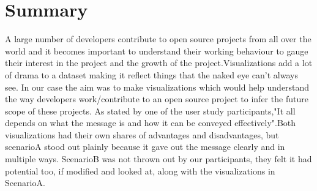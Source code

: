 \documentclass[seploa]{beavtex}
\begin{document}
\chapter{Summary}
A large number of developers contribute to open source projects from all over the world and it becomes important to understand their working behaviour to gauge their interest in the project and the growth of the project.Visualizations add a lot of drama to a dataset making it reflect things that the naked eye can't always see. In our case the aim was to make visualizations which would help understand the way developers work/contribute to an open source project to infer the future scope of these projects. As stated by one of the user study participants,"It all depends on what the message is and how it can be conveyed effectively".Both visualizations had their own shares of advantages and disadvantages, but scenarioA stood out plainly because it gave out the message clearly and in multiple ways. ScenarioB was not thrown out by our participants, they felt it had potential too, if modified and looked at, along with the visualizations in ScenarioA.




\end{document}
